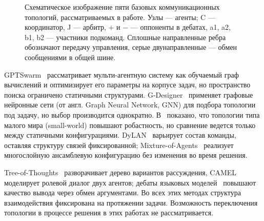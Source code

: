 \begin{figure}[!htbp]
\caption{Схематическое изображение пяти базовых коммуникационных
топологий, рассматриваемых в работе. Узлы --- агенты; C ---
координатор, J --- арбитр, $+$ и $-$ --- оппоненты в дебатах,
a1, a2, b1, b2 --- участники подкоманд. Сплошные направленные
ребра обозначают передачу управления, серые двунаправленные ---
обмен сообщениями в общей шине.}
\label{fig:rev:topologies}
\end{figure}

GPTSwarm~\cite{zhuge2024} рассматривает мульти-агентную систему
как обучаемый граф вычислений и оптимизирует его параметры на
корпусе задач, но пространство поиска ограничено статичными
структурами. G-Designer~\cite{zhang2024} применяет графовые
нейронные сети (от англ. Graph Neural Network, GNN) для подбора
топологии под задачу, но выбор производится однократно.
В~\cite{qian2024scaling} показано, что топологии типа малого мира
(small-world) повышают робастность, но сравнение ведется только
между статичными конфигурациями. DyLAN~\cite{liu2023} варьирует
состав команды, оставляя структуру связей фиксированной;
Mixture-of-Agents~\cite{moa2024} реализует многослойную ансамблевую
конфигурацию без изменения во время решения.

Tree-of-Thoughts~\cite{tot2023} разворачивает дерево вариантов
рассуждения, CAMEL~\cite{camel2023} моделирует ролевой диалог
двух агентов; дебаты языковых моделей~\cite{du2023} повышают
качество вывода через обмен аргументами. Во всех этих методах
структура взаимодействия фиксирована на протяжении задачи.
Возможность переключения топологии в процессе решения в этих
работах не рассматривается.

